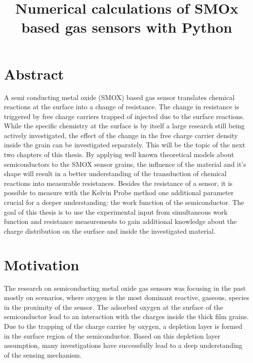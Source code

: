 \documentclass[11pt]{article}
\title{Numerical calculations of SMOx based gas sensors with Python}
\begin{document}
    
    \maketitle
    
    

    
    \tableofcontents 
\setcounter{section}{0}

    \hypertarget{abstract}{%
\section{Abstract}\label{abstract}}

A semi conducting metal oxide (SMOX) based gas sensor translates
chemical reactions at the surface into a change of resistance. The
change in resistance is triggered by free charge carriers trapped of
injected due to the surface reactions. While the specific chemistry at
the surface is by itself a large research still being actively
investigated, the effect of the change in the free charge carrier
density inside the grain can be investigated separately. This will be
the topic of the next two chapters of this thesis. By applying well
known theoretical models about semiconductors to the SMOX sensor grains,
the influence of the material and it's shape will result in a better
understanding of the transduction of chemical reactions into measurable
resistances. Besides the resistance of a sensor, it is possible to
measure with the Kelvin Probe method one additional parameter crucial
for a deeper understanding: the work function of the semiconductor. The
goal of this thesis is to use the experimental input from simultaneous
work function and resistance measurements to gain additional knowledge
about the charge distribution on the surface and inside the investigated
material.

    \hypertarget{motivation}{%
\section{Motivation}\label{motivation}}

The research on semiconducting metal oxide gas sensors was focusing in
the past mostly on scenarios, where oxygen is the most dominant
reactive, gaseous, species in the proximity of the sensor. The adsorbed
oxygen at the surface of the semiconductor lead to an interaction with
the charges inside the thick film grains. Due to the trapping of the
charge carrier by oxygen, a depletion layer is formed in the surface
region of the semiconductor. Based on this depletion layer assumption,
many investigations have successfully lead to a deep understanding of
the sensing mechanism.
\end{document}
